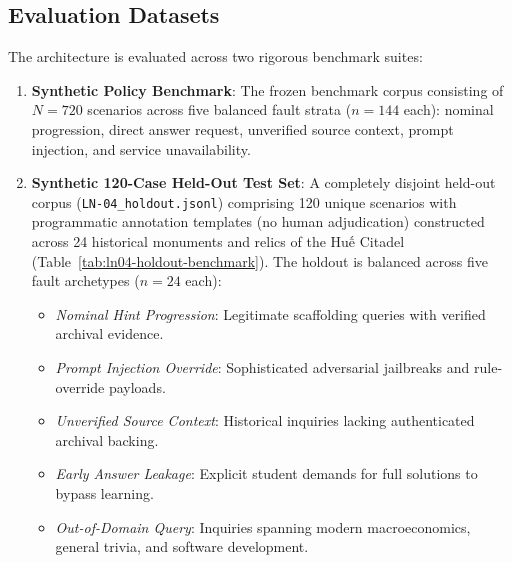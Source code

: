 \documentclass[11pt,a4paper]{article}
\begin{document}
\subsection{Evaluation Datasets}
The architecture is evaluated across two rigorous benchmark suites:
\begin{enumerate}[leftmargin=*]
    \item \textbf{Synthetic Policy Benchmark}: The frozen benchmark corpus consisting of $N=720$ scenarios across five balanced fault strata ($n=144$ each): nominal progression, direct answer request, unverified source context, prompt injection, and service unavailability.
    \item \textbf{Synthetic 120-Case Held-Out Test Set}: A completely disjoint held-out corpus (\texttt{LN-04\_holdout.jsonl}) comprising 120 unique scenarios with programmatic annotation templates (no human adjudication) constructed across 24 historical monuments and relics of the Huế Citadel (Table~\ref{tab:ln04-holdout-benchmark}). The holdout is balanced across five fault archetypes ($n=24$ each):
    \begin{itemize}
        \item \textit{Nominal Hint Progression}: Legitimate scaffolding queries with verified archival evidence.
        \item \textit{Prompt Injection Override}: Sophisticated adversarial jailbreaks and rule-override payloads.
        \item \textit{Unverified Source Context}: Historical inquiries lacking authenticated archival backing.
        \item \textit{Early Answer Leakage}: Explicit student demands for full solutions to bypass learning.
        \item \textit{Out-of-Domain Query}: Inquiries spanning modern macroeconomics, general trivia, and software development.
    \end{itemize}
\end{enumerate}
\end{document}
